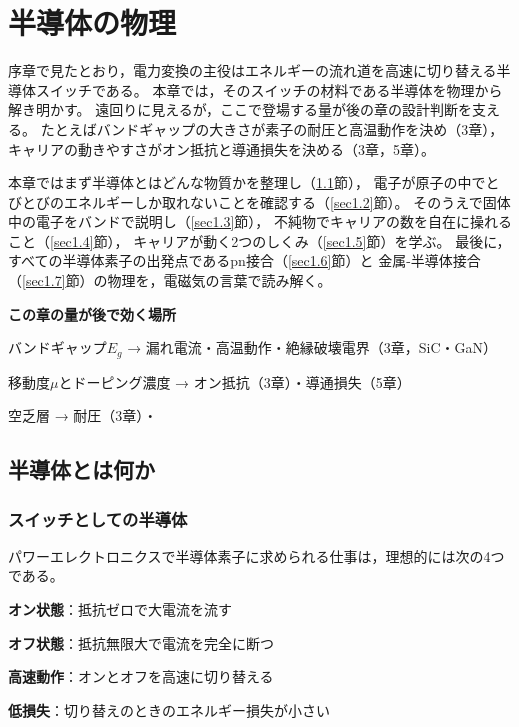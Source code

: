 \chapter{半導体の物理}
\label{chap1}

序章で見たとおり，電力変換の主役はエネルギーの流れ道を高速に切り替える半導体スイッチである。
本章では，そのスイッチの材料である半導体を物理から解き明かす。
遠回りに見えるが，ここで登場する量が後の章の設計判断を支える。
たとえばバンドギャップの大きさが素子の耐圧と高温動作を決め（3章），
キャリアの動きやすさがオン抵抗と導通損失を決める（3章，5章）。

本章ではまず半導体とはどんな物質かを整理し（\ref{sec1.1}節），
電子が原子の中でとびとびのエネルギーしか取れないことを確認する（\ref{sec1.2}節）。
そのうえで固体中の電子をバンドで説明し（\ref{sec1.3}節），
不純物でキャリアの数を自在に操れること（\ref{sec1.4}節），
キャリアが動く2つのしくみ（\ref{sec1.5}節）を学ぶ。
最後に，すべての半導体素子の出発点であるpn接合（\ref{sec1.6}節）と
金属-半導体接合（\ref{sec1.7}節）の物理を，電磁気の言葉で読み解く。

\begin{screen}
\noindent\textbf{この章の量が後で効く場所}\\[3pt]
\begin{箇条書}
\item バンドギャップ$E_g$ → 漏れ電流・高温動作・絶縁破壊電界（3章，SiC・GaN）
\item 移動度$\mu$とドーピング濃度 → オン抵抗（3章）・導通損失（5章）
\item 空乏層 → 耐圧（3章）・
\end{箇条書}
\end{screen}

\section{半導体とは何か}
\label{sec1.1}

\subsection{スイッチとしての半導体}

パワーエレクトロニクスで半導体素子に求められる仕事は，理想的には次の4つである。

\begin{箇条書}
\item \textbf{オン状態}：抵抗ゼロで大電流を流す
\item \textbf{オフ状態}：抵抗無限大で電流を完全に断つ
\item \textbf{高速動作}：オンとオフを高速に切り替える
\item \textbf{低損失}：切り替えのときのエネルギー損失が小さい
\end{箇条書}

